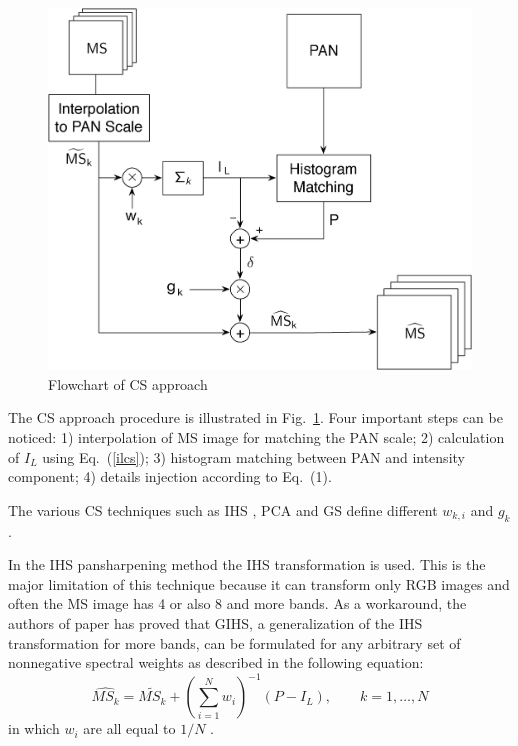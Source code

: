 \documentclass[12pt]{report}
\begin{document}
\begin{figure}[t!]
\centering
\includegraphics[width=\textwidth]{cs.png}
\caption{Flowchart of CS approach \cite{criticalComparison}}
\label{fig:csapproach}
\end{figure}


The CS approach procedure is illustrated in  Fig.~\ref{fig:csapproach}. Four important steps can be noticed: 
1) interpolation of MS image for matching the PAN scale; 2) calculation of $I_L$ using Eq.~(\ref{ilcs}); 3) histogram matching between PAN and intensity component; 4) details injection according to Eq.~(1).

The various CS techniques such as IHS \cite{ihs1,ihs2}, PCA \cite{pca2,changedetection} and GS \cite{gs,cs3} define different $w_{k,i}$ and $g_k$.

In the IHS pansharpening method the IHS transformation is used. This is the major limitation of this technique because it can transform only RGB images and often the MS image has 4 or also 8 and more bands. As a workaround, the authors of paper \cite{cs6} has proved that GIHS, a generalization of the IHS transformation for more bands, can be formulated for any arbitrary set of nonnegative spectral weights as described in the following equation: 
%
\begin{equation}
    \widehat{MS_k} = \widetilde{MS_k} + \left(\sum_{i=1}^{N}w_i\right)^{-1}(P - I_L), \qquad 
    k = 1,\dots,N
    \label{cs2}
\end{equation}
%
in which $w_i$ are all equal to $1/N$ \cite{ihs1}.
\end{document}
